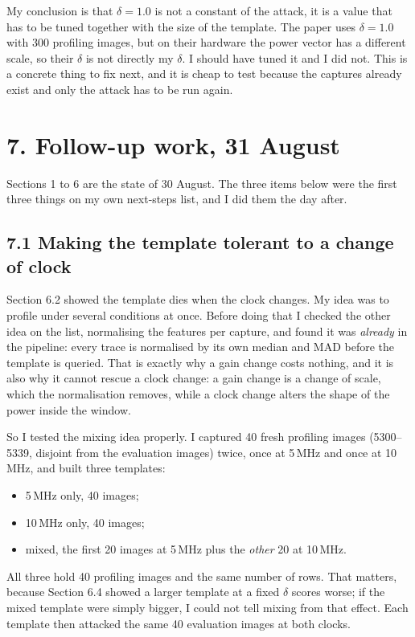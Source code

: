 \documentclass[11pt,a4paper]{article}
\begin{document}
My conclusion is that $\delta = 1.0$ is not a constant of the attack, it is a value that
has to be tuned together with the size of the template. The paper uses $\delta = 1.0$
with 300 profiling images, but on their hardware the power vector has a different scale,
so their $\delta$ is not directly my $\delta$. I should have tuned it and I did not.
This is a concrete thing to fix next, and it is cheap to test because the captures
already exist and only the attack has to be run again.


\section*{7. Follow-up work, 31 August}

Sections 1 to 6 are the state of 30 August. The three items below were the first three
things on my own next-steps list, and I did them the day after.

\subsection*{7.1 Making the template tolerant to a change of clock}

Section 6.2 showed the template dies when the clock changes. My idea was to profile
under several conditions at once. Before doing that I checked the other idea on the
list, normalising the features per capture, and found it was \emph{already} in the
pipeline: every trace is normalised by its own median and MAD before the template is
queried. That is exactly why a gain change costs nothing, and it is also why it cannot
rescue a clock change: a gain change is a change of scale, which the normalisation
removes, while a clock change alters the shape of the power inside the window.

So I tested the mixing idea properly. I captured 40 fresh profiling images
(5300--5339, disjoint from the evaluation images) twice, once at 5\,MHz and once at
10\,MHz, and built three templates:

\begin{itemize}
\item 5\,MHz only, 40 images;
\item 10\,MHz only, 40 images;
\item mixed, the first 20 images at 5\,MHz plus the \emph{other} 20 at 10\,MHz.
\end{itemize}

All three hold 40 profiling images and the same number of rows. That matters, because
Section 6.4 showed a larger template at a fixed $\delta$ scores worse; if the mixed
template were simply bigger, I could not tell mixing from that effect. Each template
then attacked the same 40 evaluation images at both clocks.
\end{document}
